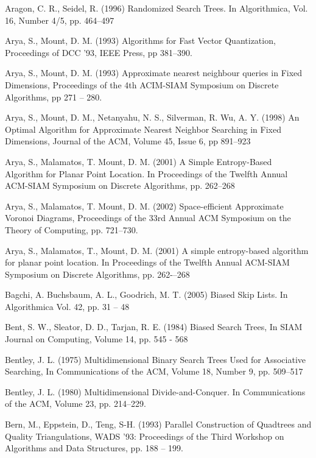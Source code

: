 \documentclass[mcs]{scsthesis}
\begin{document}
\begin{thebibliography}{5}

Aragon, C. R.,  Seidel, R. (1996) Randomized Search Trees.
In Algorithmica, Vol. 16, Number 4/5, pp. 464--497

Arya, S., Mount, D. M. (1993) Algorithms for Fast Vector Quantization,
Proceedings of DCC '93, IEEE Press, pp 381--390. 

Arya, S., Mount, D. M. (1993) Approximate nearest neighbour queries in Fixed
Dimensions, Proceedings of the 4th ACIM-SIAM Symposium on Discrete Algorithms,
pp 271 -- 280.

Arya, S., Mount, D. M., Netanyahu, N. S., Silverman, R. Wu, A. Y. (1998)
An Optimal Algorithm for Approximate Nearest Neighbor Searching in Fixed
Dimensions, Journal of the ACM, Volume 45, Issue 6, pp 891--923

Arya, S., Malamatos, T. Mount, D. M. (2001) A Simple Entropy-Based Algorithm
for Planar Point Location. In Proceedings of the Twelfth Annual ACM-SIAM
Symposium on Discrete Algorithms, pp. 262--268

Arya, S., Malamatos, T. Mount, D. M. (2002) Space-efficient Approximate
Voronoi Diagrams, Proceedings of the 33rd Annual ACM Symposium on the Theory
of Computing, pp. 721--730.

Arya, S., Malamatos, T., Mount, D. M. (2001) A simple entropy-based algorithm
for planar point location.
In Proceedings of the Twelfth Annual ACM-SIAM Symposium on Discrete Algorithms,
pp. 262-–268

Bagchi, A. Buchsbaum, A. L., Goodrich, M. T. (2005) Biased Skip Lists.
In Algorithmica Vol. 42, pp. 31 – 48

Bent, S. W., Sleator, D. D., Tarjan, R. E. (1984) Biased Search Trees,
In SIAM Journal on Computing, Volume 14, pp. 545 - 568

Bentley, J. L. (1975) Multidimensional Binary Search Trees Used for Associative
Searching, In Communications of the ACM, Volume 18, Number 9, pp. 509--517 

Bentley, J. L. (1980) Multidimensional Divide-and-Conquer.
In Communications of the ACM, Volume 23, pp. 214--229.

Bern, M., Eppstein, D., Teng, S-H. (1993) Parallel Construction of Quadtrees and
Quality Triangulations, WADS '93: Proceedings of the Third Workshop on
Algorithms and Data Structures, pp. 188 -- 199. 


\end{thebibliography}
\end{document}
